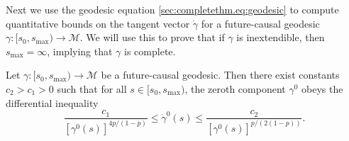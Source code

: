 \documentclass{article}
\newcommand{\mc}{\mathcal}
\newcommand{\ra}{\rightarrow}
\begin{document}
Next we use the geodesic equation \eqref{sec:completethm.eq:geodesic} to compute quantitative bounds on the tangent vector $\dot{\gamma}$ for a future-causal geodesic $\gamma:[s_0,s_{\max}) \ra \mc{M}$. We will use this to prove that if $\gamma$ is inextendible, then $s_{\max} = \infty$, implying that $\gamma$ is complete. 
\begin{lemma}\label{sec:completethm.lem:geodesicbound}
    Let $\gamma:[s_0,s_{\max}) \ra \mc{M}$ be a future-causal geodesic. Then there exist constants $c_2 > c_1 > 0$ such that for all $s \in [s_0,s_{\max})$, the zeroth component $\gamma^0$ obeys the differential inequality
    \begin{equation}
        \frac{c_1}{[\gamma^0(s)]^{4p/(1-p)}} \leq \dot{\gamma}^0(s) \leq \frac{c_2}{[\gamma^0(s)]^{p/(2(1-p))}}.
    \end{equation}
\end{lemma}
\end{document}
